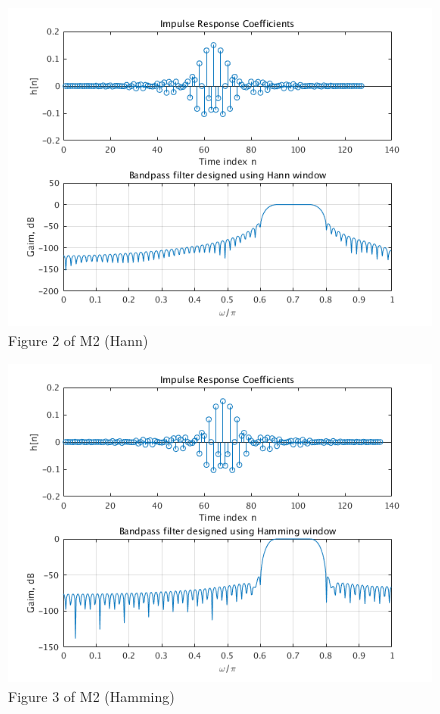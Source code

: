 \documentclass[11pt,a4paper,twoside]{article}
\begin{document}
\begin{figure}[H]
\centering
\includegraphics[width=0.8\linewidth]{img/m2_2}
\caption{Figure 2 of M2 (Hann)}
\label{Figure 2 of M2}
\end{figure}

\begin{figure}[H]
\centering
\includegraphics[width=0.8\linewidth]{img/m2_3}
\caption{Figure 3 of M2 (Hamming)}
\label{Figure 3 of M2}
\end{figure}
\end{document}
